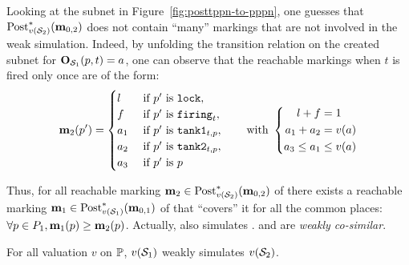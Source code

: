 Looking at the subnet in Figure~\ref{fig:posttppn-to-pppn},
one guesses that $\posts[\val({\namePPN[2]})]{\mar_{0,2}}$ does not contain “many” markings that are not involved in the weak simulation.
Indeed, by unfolding the transition relation on the created subnet for $\outm[\namePPN[1]][p,t] = a$, one can observe that the reachable markings when $t$ is fired only once are of the form:
\begin{align}
  \label{eqn:widget-reachable-markings}
  \mar_2(p') =
  \begin{cases}
    l   &\text{ if } p' \text{ is } \mathtt{lock}, \\
    f   &\text{ if } p' \text{ is } \mathtt{firing}_t, \\
    a_1 &\text{ if } p' \text{ is } \mathtt{tank1}_{t,p}, \\
    a_2 &\text{ if } p' \text{ is } \mathtt{tank2}_{t,p}, \\
    a_3 &\text{ if } p' \text{ is } p
  \end{cases}
  \text{\qquad with }
  \left\{
    \begin{aligned}
      l + f &= 1 \\
      a_1 + a_2 &= \val[a] \\
      a_3 \leq a_1 &\leq \val[a]
    \end{aligned}
  \right.
\end{align}

Thus, for all reachable marking $\mar_2 \in \Post^*_{v(\namePPN[2])}(\mar_{0,2})$ of \namePPN[2] there exists a reachable marking $\mar_1 \in \Post^*_{v(\namePPN[1])}(\mar_{0,1})$ of \namePPN[1] that ``covers'' it for all the common places: $\forall p \in \places_1, \mar_1(p) \geq \mar_2(p)$.
Actually, \namePPN[1] also simulates \namePPN[2].
\namePPN[1] and \namePPN[2] are \emph{weakly co-similar}.

\begin{lemm}
  For all valuation $v$ on $\parameters$, $v(\namePPN[1])$ weakly simulates $v(\namePPN[2])$.
\end{lemm}


